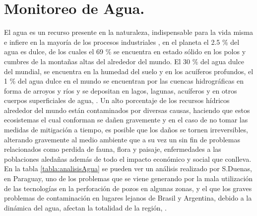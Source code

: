 \section{Monitoreo de Agua.}
El agua es un recurso presente en la naturaleza, indispensable para la vida misma e infiere en la mayoría de los procesos industriales \cite{estudio_agua}, en el planeta el 2.5 \% del agua es dulce, de los cuales el 69 \% se encuentra en estado sólido en los polos y cumbres de la monta\~nas altas del alrededor del mundo. El 30 \% del agua dulce del mundial, se encuentra en la humedad del suelo y en los acuíferos profundos, el 1 \% del agua dulce en el mundo se encuentran por las cuencas hidrográficas en forma de arroyos y ríos y se depositan en lagos, lagunas, acuíferos y en otros cuerpos superficiales de agua,  \cite{junta-municipal-de-agua-potable-y-alcantarillado-de-mazatlan-no-date}.
Un alto porcentaje de los recursos h\'idricos alrededor del mundo están contaminados por diversas causas, haciendo que estos ecosistemas el cual conforman se dañen gravemente y en el caso de no tomar las medidas de mitigación a tiempo, es posible que los da\~nos se tornen irreversibles, alterando gravemente al medio ambiente que a su vez un sin fin de problemas relacionados como perdida de fauna, flora y paisaje, enfermedades a las poblaciones aledañas además de todo el impacto económico y social que conlleva.
En la tabla \ref{tabla:analisisAgua} se pueden ver un an\'alisis realizado por S.Duenas, en Paraguay, uno de los problemas que se viene generando por la mala utilización de las tecnologías en la perforación de pozos en algunas zonas, y el que los graves problemas de contaminación en lugares lejanos de Brasil y Argentina, debido a la dinámica del agua, afectan la totalidad de la región,
\cite{salas-duenas-2015}.
